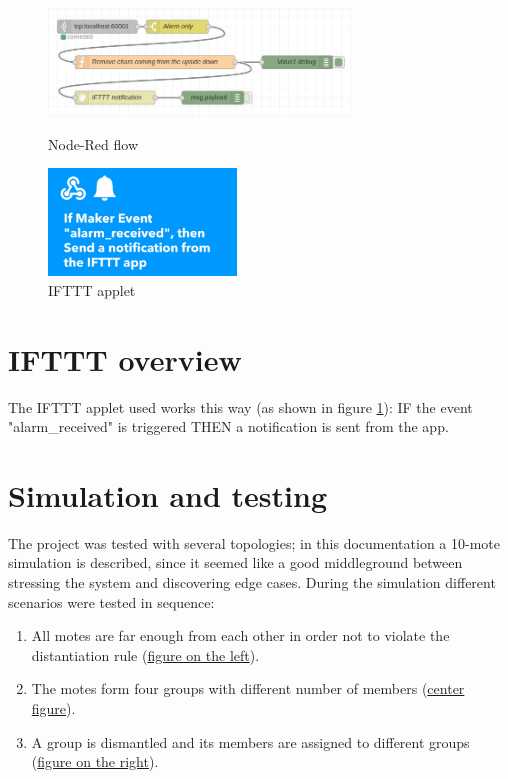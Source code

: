 \documentclass[11pt]{article}
\begin{document}
\begin{figure}[H]
  \begin{minipage}{0.6\textwidth}
    \includegraphics[height=108px]{Node-red-flow}
    \caption{Node-Red flow}
    \label{nodered}
  \end{minipage}
  \begin{minipage}{0.39\textwidth}
    \includegraphics[height=108px]{ifttt-screenshot}
    \caption{IFTTT applet}
    \label{ifttt}
  \end{minipage}
\end{figure}

\section{IFTTT overview}
The IFTTT applet used works this way (as shown in figure \ref{ifttt}): \newline
IF the event "alarm\_received" is triggered \newline
THEN a notification is sent from the app.

\section{Simulation and testing}
The project was tested with several topologies; in this documentation a 10-mote simulation is described, since it seemed like a good middleground between stressing the system and discovering edge cases. \newline
During the simulation different scenarios were tested in sequence:
\begin{enumerate}
  \item All motes are far enough from each other in order not to violate the distantiation rule (\hyperref[distantiation]{figure on the left}).
  \item The motes form four groups with different number of members (\hyperref[small-groups]{center figure}).
  \item A group is dismantled and its members are assigned to different groups (\hyperref[crowded-groups]{figure on the right}).
\end{enumerate}
\end{document}
